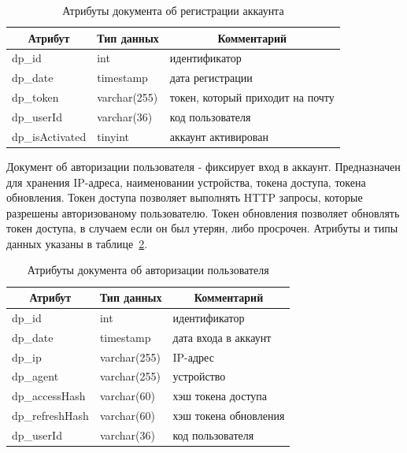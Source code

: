 \begin{table}[!htb]
    \centering\small

    \caption{Атрибуты документа об регистрации аккаунта}
    \label{tab:DP_DOC_ActivatedAccount}
    
    \begin{tabular}{|p{5cm}|p{2.5cm}|p{9cm}|}
        \hline
        \multicolumn{1}{|c|}{Атрибут}
        & \multicolumn{1}{c|}{Тип данных}
        & \multicolumn{1}{c|}{Комментарий}
        \\ \hline

        dp\_id & int & идентификатор \\ \hline
        dp\_date & timestamp & дата регистрации \\ \hline
        dp\_token & varchar(255) & токен, который приходит на почту \\ \hline
        dp\_userId & varchar(36) & код пользователя \\ \hline
        dp\_isActivated & tinyint & аккаунт активирован \\ \hline
    \end{tabular}
\end{table}

Документ об авторизации пользователя - фиксирует вход в аккаунт.
Предназначен для хранения IP-адреса, наименовании устройства, токена доступа, токена обновления.
Токен доступа позволяет выполнять HTTP запросы, которые разрешены авторизованому пользователю.
Токен обновления позволяет обновлять токен доступа, в случаем если он был утерян, либо просрочен.
Атрибуты и типы данных указаны в таблице~\ref{tab:DP_DOC_Sessions}.

\begin{table}[!htb]
    \centering\small

    \caption{Атрибуты документа об авторизации пользователя}
    \label{tab:DP_DOC_Sessions}

    \begin{tabular}{|p{5cm}|p{2.5cm}|p{9cm}|}
        \hline
        \multicolumn{1}{|c|}{Атрибут}
        & \multicolumn{1}{c|}{Тип данных}
        & \multicolumn{1}{c|}{Комментарий}
        \\ \hline

        dp\_id & int & идентификатор \\ \hline
        dp\_date & timestamp & дата входа в аккаунт \\ \hline
        dp\_ip & varchar(255) & IP-адрес \\ \hline
        dp\_agent & varchar(255) & устройство \\ \hline
        dp\_accessHash & varchar(60) & хэш токена доступа \\ \hline
        dp\_refreshHash & varchar(60) & хэш токена обновления \\ \hline
        dp\_userId & varchar(36) & код пользователя \\ \hline
    \end{tabular}
\end{table}

